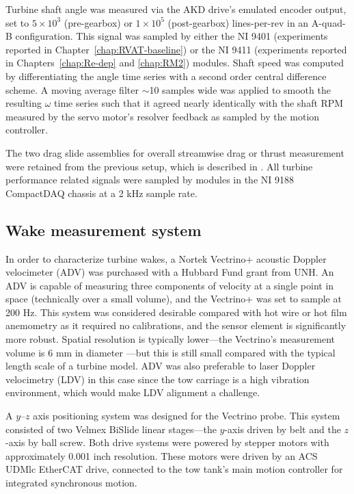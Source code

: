 Turbine shaft angle was measured via the AKD drive's emulated encoder output,
set to $5 \times 10^3$ (pre-gearbox) or $1 \times 10^5$ (post-gearbox)
lines-per-rev in an A-quad-B configuration. This signal was sampled by either
the NI 9401 (experiments reported in Chapter~\ref{chap:RVAT-baseline}) or the NI
9411 (experiments reported in Chapters~\ref{chap:Re-dep} and \ref{chap:RM2})
modules. Shaft speed was computed by differentiating the angle time series with
a second order central difference scheme. A moving average filter $\sim$10
samples wide was applied to smooth the resulting $\omega$ time series such that
it agreed nearly identically with the shaft RPM measured by the servo motor's
resolver feedback as sampled by the motion controller.

The two drag slide assemblies for overall streamwise drag or thrust measurement
were retained from the previous setup, which is described in
\cite{Bachant2011-MS}. All turbine performance related signals were sampled by
modules in the NI 9188 CompactDAQ chassis at a 2 kHz sample rate.


\subsection{Wake measurement system}

In order to characterize turbine wakes, a Nortek Vectrino+ acoustic Doppler
velocimeter (ADV) was purchased with a Hubbard Fund grant from UNH. An ADV is
capable of measuring three components of velocity at a single point in space
(technically over a small volume), and the Vectrino+ was set to sample at 200
Hz. This system was considered desirable compared with hot wire or hot film
anemometry as it required no calibrations, and the sensor element is
significantly more robust. Spatial resolution is typically lower---the
Vectrino's measurement volume is 6 mm in diameter \cite{NortekVectrino}---but
this is still small compared with the typical length scale of a turbine model.
ADV was also preferable to laser Doppler velocimetry (LDV) in this case since
the tow carriage is a high vibration environment, which would make LDV alignment
a challenge.


A $y$--$z$ axis positioning system was designed for the Vectrino probe. This
system consisted of two Velmex BiSlide linear stages---the $y$-axis driven by
belt and the $z$-axis by ball screw. Both drive systems were powered by stepper
motors with approximately 0.001 inch resolution. These motors were driven by an
ACS UDMlc EtherCAT drive, connected to the tow tank's main motion controller for
integrated synchronous motion.

